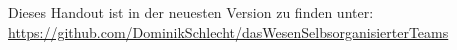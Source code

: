 \documentclass[a4paper,11pt,DIV=11,twoside]{scrartcl} %
\begin{document}
	\setcounter{page}{1}	%
	
	\tableofcontents %


	
	\vspace{\fill}
	Dieses Handout ist in der neuesten Version zu finden unter:\\
	\url{https://github.com/DominikSchlecht/dasWesenSelbsorganisierterTeams}
	\printbibliography %
\end{document}
